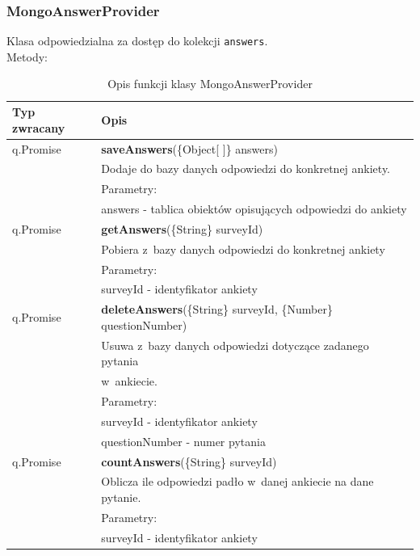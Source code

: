 \documentclass[8pt,a4paper,notitlepage]{article}
\begin{document}
\subsubsection{MongoAnswerProvider}
Klasa odpowiedzialna za dostęp do kolekcji \texttt{answers}. \\ 
Metody: 
\begin{center}
\begin{table}[H]
\caption{Opis funkcji klasy MongoAnswerProvider}
  \begin{tabular}{| l| l|}%
    \hline
    Typ zwracany & Opis \\ \hline \hline
  	q.Promise	&	\textbf{saveAnswers}(\{Object[ ]\} answers) \\
 &  Dodaje do bazy danych odpowiedzi do konkretnej ankiety. \\ 
 & Parametry: \\
 & answers - tablica obiektów opisujących odpowiedzi do ankiety \\ 
 \hline

q.Promise	&	\textbf{getAnswers}(\{String\} surveyId) \\
 &  Pobiera z~bazy danych odpowiedzi do konkretnej ankiety \\ 
 & Parametry: \\
 & surveyId - identyfikator ankiety \\ 
\hline
   
q.Promise	&	\textbf{deleteAnswers}(\{String\} surveyId, \{Number\} questionNumber) \\
 &  Usuwa z~bazy danych odpowiedzi dotyczące zadanego pytania \\ &  w~ankiecie.\\ 
 & Parametry: \\
 & surveyId - identyfikator ankiety \\ 
 & questionNumber - numer pytania \\
 \hline

q.Promise	&	\textbf{countAnswers}(\{String\} surveyId) \\
 &  Oblicza  ile odpowiedzi padło w~danej ankiecie na dane pytanie.\\ 
 & Parametry: \\
 & surveyId - identyfikator ankiety \\ 
 \hline
 
  \end{tabular}
\end{table}
\end{center}
\end{document}
